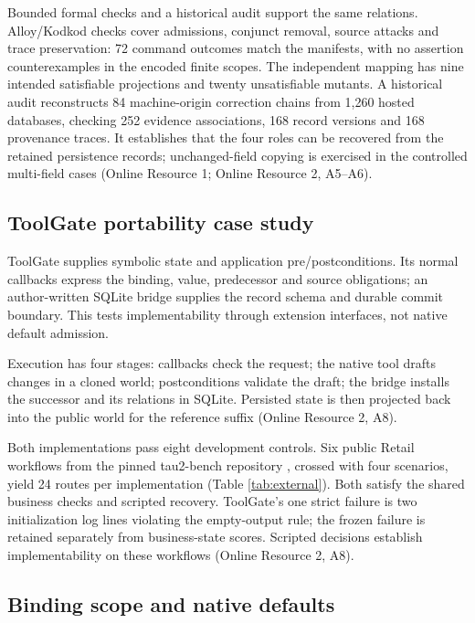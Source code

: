 Bounded formal checks and a historical audit support the same relations. Alloy/Kodkod checks \citep{alloy,kodkod} cover admissions, conjunct removal, source attacks and trace preservation: 72 command outcomes match the manifests, with no assertion counterexamples in the encoded finite scopes. The independent mapping has nine intended satisfiable projections and twenty unsatisfiable mutants. A historical audit reconstructs 84 machine-origin correction chains from 1,260 hosted databases, checking 252 evidence associations, 168 record versions and 168 provenance traces. It establishes that the four roles can be recovered from the retained persistence records; unchanged-field copying is exercised in the controlled multi-field cases (Online Resource 1; Online Resource 2, A5--A6).

\subsection{ToolGate portability case study}\label{configured-toolgate-on-public-reference-workflows}

ToolGate \citep{toolgate} supplies symbolic state and application pre/postconditions. Its normal callbacks express the binding, value, predecessor and source obligations; an author-written SQLite bridge supplies the record schema and durable commit boundary. This tests implementability through extension interfaces, not native default admission.

Execution has four stages: callbacks check the request; the native tool drafts changes in a cloned world; postconditions validate the draft; the bridge installs the successor and its relations in SQLite. Persisted state is then projected back into the public world for the reference suffix (Online Resource 2, A8).

Both implementations pass eight development controls. Six public Retail workflows from the pinned tau2-bench repository \citep{tau2-bench}, crossed with four scenarios, yield 24 routes per implementation (Table \ref{tab:external}). Both satisfy the shared business checks and scripted recovery. ToolGate's one strict failure is two initialization log lines violating the empty-output rule; the frozen failure is retained separately from business-state scores. Scripted decisions establish implementability on these workflows (Online Resource 2, A8).



\subsection{Binding scope and native defaults}\label{binding-scope-and-native-defaults}

